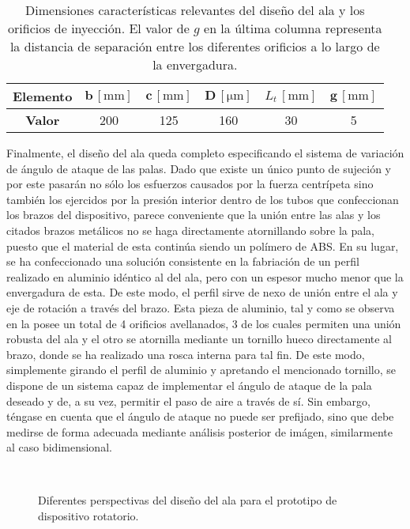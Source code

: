 \begin{table}
\centering	
\begin{tabular}{c || c c c c c}
\textbf{Elemento} & $\mathbf{b}\,[\mathrm{mm}]$ & $\mathbf{c}\,[\mathrm{mm}]$ & $\mathbf{D}\,[\mathrm{\mu m}]$ & $L_{t}\,[\mathrm{mm}]$ & $\mathbf{g}\,[\mathrm{mm}]$ \\
\hline \hline 
\textbf{Valor} & 200 & 125 & 160 & 30 & 5 \\
\hline

\end{tabular}
\caption{Dimensiones características relevantes del diseño del ala y los orificios de inyección. El valor de $g$ en la última columna representa la distancia de separación entre los diferentes orificios a lo largo de la envergadura. }
\end{table}


Finalmente, el diseño del ala queda completo especificando el sistema de variación de ángulo de ataque de las palas. Dado que existe un único punto de sujeción y por este pasarán no sólo los esfuerzos causados por la fuerza centrípeta sino también los ejercidos por la presión interior dentro de los tubos que confeccionan los brazos del dispositivo, parece conveniente que la unión entre las alas y los citados brazos metálicos no se haga directamente atornillando sobre la pala, puesto que el material de esta continúa siendo un polímero de ABS. En su lugar, se ha confeccionado una solución consistente en la fabriación de un perfil realizado en aluminio  idéntico al del ala, pero con un espesor mucho menor que la envergadura de esta. De este modo, el perfil sirve de nexo de unión entre el ala y eje de rotación a través del brazo. Esta pieza de aluminio, tal y como se observa en la  posee un total de 4 orificios avellanados, 3 de los cuales permiten una unión robusta del ala y el otro se atornilla mediante un tornillo hueco directamente al brazo, donde se ha realizado una rosca interna para tal fin. De este modo, simplemente girando el perfil de aluminio y apretando el mencionado tornillo, se dispone de un sistema capaz de implementar el ángulo de ataque de la pala deseado y de, a su vez, permitir el paso de aire a través de sí. Sin embargo, téngase en cuenta que el ángulo de ataque no puede ser prefijado, sino que debe medirse de forma adecuada mediante análisis posterior de imágen, similarmente al caso bidimensional. 

\begin{figure}
\centering
{}
 \\
\caption{Diferentes perspectivas del diseño del ala para el prototipo de dispositivo rotatorio.}
\end{figure}



